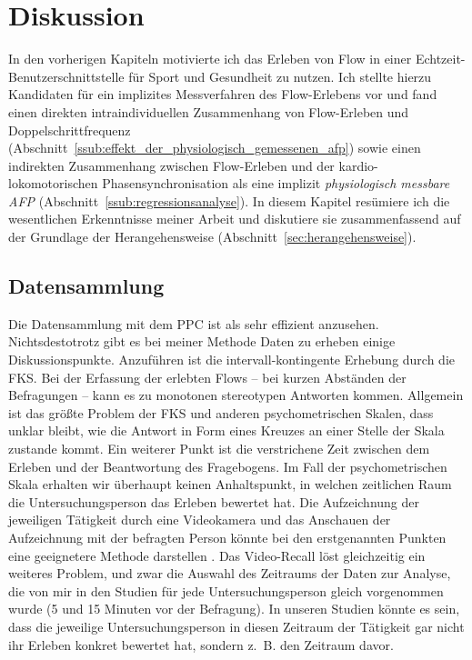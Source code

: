 

\chapter{Diskussion} \label{cha:diskussion} In den vorherigen Kapiteln motivierte ich das Erleben von Flow in einer Echtzeit-Benutzerschnittstelle für Sport und Gesundheit zu nutzen. Ich stellte hierzu Kandidaten für ein implizites Messverfahren des Flow-Erlebens vor und fand einen direkten intraindividuellen Zusammenhang von Flow-Erleben und Doppelschrittfrequenz (Abschnitt~\ref{ssub:effekt_der_physiologisch_gemessenen_afp}) sowie einen indirekten Zusammenhang zwischen Flow-Erleben und der kardio-lokomotorischen Phasensynchronisation als eine implizit \emph{physiologisch messbare \ac{AFP}} (Abschnitt~\ref{ssub:regressionsanalyse}). In diesem Kapitel resümiere ich die wesentlichen Erkenntnisse meiner Arbeit und diskutiere sie zusammenfassend auf der Grundlage der Herangehensweise (Abschnitt~\ref{sec:herangehensweise}). 

\section{Datensammlung} 

\label{sec:datensammlung}

Die Datensammlung mit dem \ac{PPC} ist als sehr effizient anzusehen. Nichtsdestotrotz gibt es bei meiner Methode Daten zu erheben einige Diskussionspunkte. Anzuführen ist die intervall-kontingente Erhebung durch die \ac{FKS}. Bei der Erfassung der erlebten Flows -- bei kurzen Abständen der Befragungen -- kann es zu monotonen stereotypen Antworten kommen. Allgemein ist das größte Problem der \ac{FKS} und anderen psychometrischen Skalen, dass unklar bleibt, wie die Antwort in Form eines Kreuzes an einer Stelle der Skala zustande kommt. Ein weiterer Punkt ist die verstrichene Zeit zwischen dem Erleben und der Beantwortung des Fragebogens. Im Fall der psychometrischen Skala erhalten wir überhaupt keinen Anhaltspunkt, in welchen zeitlichen Raum die Untersuchungsperson das Erleben bewertet hat. Die Aufzeichnung der jeweiligen Tätigkeit durch eine Videokamera und das Anschauen der Aufzeichnung mit der befragten Person könnte bei den erstgenannten Punkten eine geeignetere Methode darstellen \citep[Video-Recall,][S.~566]{Leuchter2006}. Das Video-Recall löst gleichzeitig ein weiteres Problem, und zwar die Auswahl des Zeitraums der Daten zur Analyse, die von mir in den Studien für jede Untersuchungsperson gleich vorgenommen wurde (5 und 15 Minuten vor der Befragung). In unseren Studien könnte es sein, dass die jeweilige Untersuchungsperson in diesen Zeitraum der Tätigkeit gar nicht ihr Erleben konkret bewertet hat, sondern z.~B. den Zeitraum davor. 

